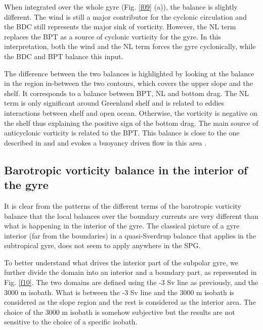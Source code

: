 \documentclass[os, manuscript]{copernicus}
\begin{document}
When integrated over the whole gyre (Fig. \ref{f09} (a)), the balance is slightly different. The wind is still a major contributor for the cyclonic circulation and the BDC still represents the major sink of vorticity. However, the NL term replaces the BPT as a source of cyclonic vorticity for the gyre. In this interpretation, both the wind and the NL term forces the gyre cyclonically, while the BDC and BPT balance this input. 


The difference between the two balances is highlighted by looking at the balance in the region in-between the two contours, which covers the upper slope and the shelf. It corresponds to a balance between BPT, NL and bottom drag. The NL term is only significant around Greenland shelf and is related to eddies interactions between shelf and open ocean. Otherwise, the vorticity is negative on the shelf thus explaining the positive sign of the bottom drag. The main source of anticyclonic vorticity is related to the BPT. This balance is close to the one described in \citet{csanady1978} and \citet{csanady1997} and evokes a buoyancy driven flow in this area \citep{chapman1986,chapman1989}.



\subsection{Barotropic vorticity balance in the interior of the gyre}

It is clear from the patterns of the different terms of the barotropic vorticity balance that the local balances over the boundary currents are very different than what is happening in the interior of the gyre. The classical picture of a gyre interior (far from the boundaries) in a quasi-Sverdrup balance that applies in the subtropical gyre,  does not seem to apply anywhere in the SPG. 

To better understand what drives the interior part of the subpolar gyre, we further divide the domain into an interior and a boundary part, as represented in Fig. \ref{f10}. The two domains are defined using the -3 Sv line as previously, and the 3000 m isobath. What is between the -3 Sv line and the 3000 m isobath is considered as the slope region and the rest is considered as the interior area. The choice of the 3000 m isobath is somehow subjective but the results are not sensitive to the choice of a specific isobath. 
\end{document}
